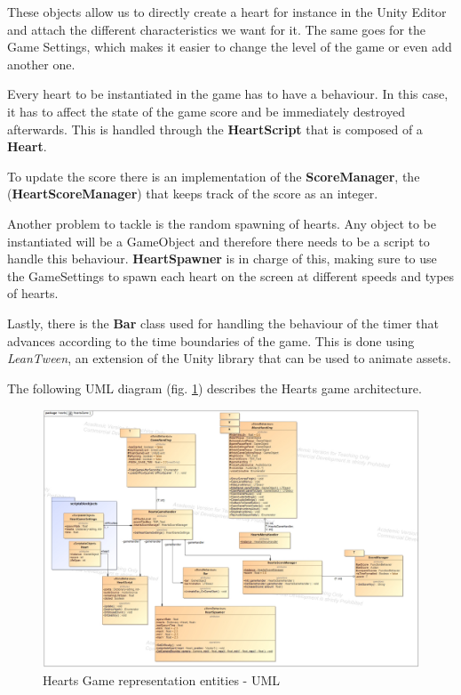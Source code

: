 These objects allow us to directly create a heart for instance in the Unity Editor and attach the different characteristics we want for it. The same goes for the Game Settings, which makes it easier to change the level of the game or even add another one.

Every heart to be instantiated in the game has to have a behaviour. In this case, it has to affect the state of the game score and be immediately destroyed afterwards. This is handled through the \textbf{HeartScript} that is composed of a \textbf{Heart}.

To update the score there is an implementation of the 
\textbf{ScoreManager}, the (\textbf{HeartScoreManager}) that keeps track of the score as an integer.

Another problem to tackle is the random spawning of hearts. Any object to be instantiated will be a GameObject and therefore there needs to be a script to handle this behaviour. \textbf{HeartSpawner} is in charge of this, making sure to use the GameSettings to spawn each heart on the screen at different speeds and types of hearts.

Lastly, there is the \textbf{Bar} class used for handling the behaviour of the timer that advances according to the time boundaries of the game. This is done using \textit{LeanTween}, an extension of the Unity library that can be used to animate assets.

The following UML diagram (fig. \ref{fig:heartsGameArq}) describes the Hearts game architecture.

\begin{figure}[H]
    \centering
    \includegraphics[width=\linewidth]{Chapters/new_architechture/class__hearts__HeartsGame.jpg}
    \caption{Hearts Game representation entities - UML}
    \label{fig:heartsGameArq}
\end{figure}

